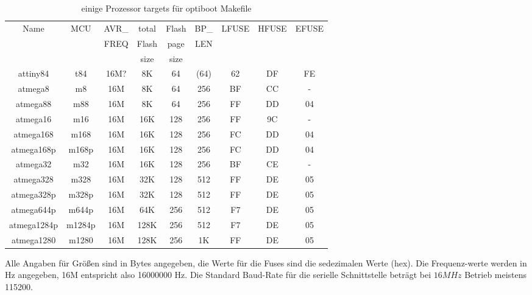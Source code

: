 \begin{table}[H]
  \begin{center}
    \begin{tabular}{| c | c | c | c | c | c | c | c | c |}
    \hline
             Name  & MCU & AVR\_ & total & Flash & BP\_ & LFUSE & HFUSE & EFUSE  \\
                   &     & FREQ  & Flash & page  & LEN  &       &       &        \\
                   &     &       &  size & size  &      &       &       &        \\
    \hline
    \hline
         attiny84 & t84   & 16M? &  8K   &  64   & (64) &  62   &  DF   & FE \\
    \hline
         atmega8  & m8    & 16M  &  8K   &  64   & 256  &  BF   &  CC   &  - \\
    \hline
         atmega88 & m88   & 16M  &  8K   &  64   & 256  &  FF   &  DD   &  04 \\
    \hline
       atmega16   & m16   & 16M  &  16K  & 128   & 256  &  FF   &  9C   &  - \\
    \hline
       atmega168  &  m168  & 16M  &  16K & 128   & 256  &  FC   &  DD   &  04 \\
       atmega168p &  m168p & 16M  &  16K & 128   & 256  &  FC   &  DD   &  04 \\
    \hline
       atmega32   &  m32   & 16M  &  16K & 128   & 256  &  BF   &  CE   &  - \\
    \hline
       atmega328  &  m328  & 16M  &  32K & 128   & 512  &  FF   &  DE   &  05 \\
       atmega328p & m328p & 16M  &  32K  & 128   & 512  &  FF   &  DE   &  05 \\
    \hline
       atmega644p & m644p & 16M  &  64K  & 256   & 512  &  F7   &  DE   &  05 \\
    \hline
     atmega1284p & m1284p & 16M  & 128K  & 256   & 512  &  F7   &  DE   &  05 \\
    \hline
     atmega1280  & m1280  & 16M  &  128K & 256   & 1K   &  FF   &  DE   &  05 \\
    \hline
    \end{tabular}
  \end{center}
  \caption{einige Prozessor targets für optiboot Makefile}
  \label{tab:processors}
\end{table}

Alle Angaben für Größen sind in Bytes angegeben, die Werte für die Fuses sind die sedezimalen
Werte (hex). Die Frequenz-werte werden in Hz angegeben, 16M entspricht also 16000000 Hz.
Die Standard Baud-Rate für die serielle Schnittstelle beträgt bei \(16 MHz\) Betrieb meistens 115200.

